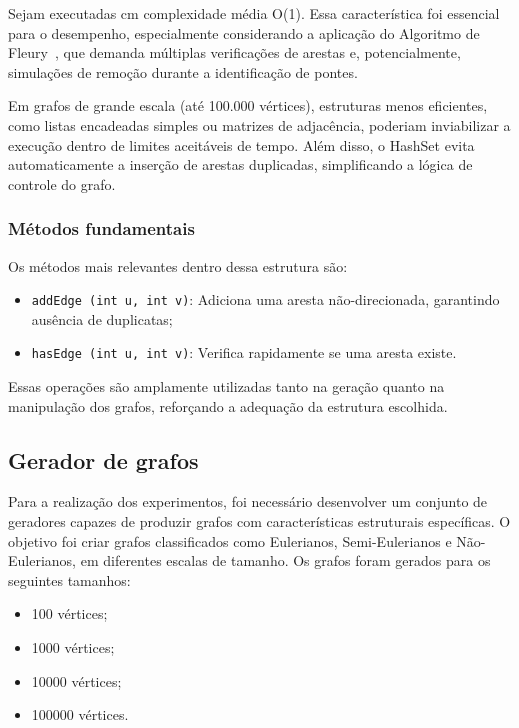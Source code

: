 \documentclass{sbc2023}%
\begin{document}
Sejam executadas cm complexidade média O(1).
Essa característica foi essencial para o desempenho, especialmente considerando a aplicação do Algoritmo de Fleury~\citep{AlgoFleury}, que demanda múltiplas verificações de arestas e, potencialmente, simulações de remoção durante a identificação de pontes.

Em grafos de grande escala (até 100.000 vértices), estruturas menos eficientes, como listas encadeadas simples ou matrizes de adjacência, poderiam inviabilizar a execução dentro de limites aceitáveis de tempo. Além disso, o HashSet evita automaticamente a inserção de arestas duplicadas, simplificando a lógica de controle do grafo.

\subsubsection{Métodos fundamentais}

Os métodos mais relevantes dentro dessa estrutura são:
\begin{itemize}
    \item \lstinline|addEdge (int u, int v)|: Adiciona uma aresta não-direcionada, garantindo ausência de duplicatas;
    \item \lstinline|hasEdge (int u, int v)|: Verifica rapidamente se uma aresta existe.
\end{itemize}

Essas operações são amplamente utilizadas tanto na geração quanto na manipulação dos grafos, reforçando a adequação da estrutura escolhida.

\subsection{Gerador de grafos}

Para a realização dos experimentos, foi necessário desenvolver um conjunto de geradores capazes de produzir grafos com características estruturais específicas. O objetivo foi criar grafos classificados como Eulerianos, Semi-Eulerianos e Não-Eulerianos, em diferentes escalas de tamanho.
Os grafos foram gerados para os seguintes tamanhos:
\begin{itemize}
    \item 100 vértices;
    \item 1000 vértices;
    \item 10000 vértices;
    \item 100000 vértices.
\end{itemize}
\end{document}
